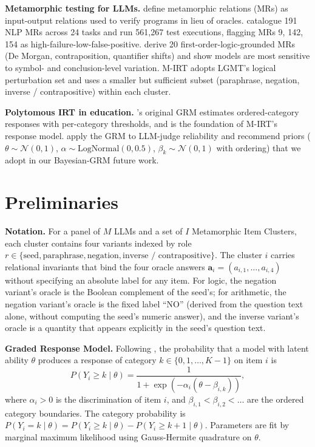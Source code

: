 \documentclass[11pt,letterpaper]{article}
\begin{document}
\textbf{Metamorphic testing for LLMs.} \citet{Chen2018} define metamorphic relations (MRs) as input-output relations used to verify programs in lieu of oracles. \citet{Cho2025} catalogue 191 NLP MRs across 24 tasks and run 561{,}267 test executions, flagging MRs 9, 142, 154 as high-failure-low-false-positive. \citet{Zhou2026} derive 20 first-order-logic-grounded MRs (De Morgan, contraposition, quantifier shifts) and show models are most sensitive to symbol- and conclusion-level variation. M-IRT adopts LGMT's logical perturbation set and uses a smaller but sufficient subset (paraphrase, negation, inverse / contrapositive) within each cluster.

\textbf{Polytomous IRT in education.} \citet{Samejima1968}'s original GRM estimates ordered-category responses with per-category thresholds, and is the foundation of M-IRT's response model. \citet{Choi2026} apply the GRM to LLM-judge reliability and recommend priors ($\theta \sim \mathcal{N}(0, 1)$, $\alpha \sim \mathrm{LogNormal}(0, 0.5)$, $\beta_k \sim \mathcal{N}(0, 1)$ with ordering) that we adopt in our Bayesian-GRM future work.

\section{Preliminaries}

\textbf{Notation.} For a panel of $M$ LLMs and a set of $I$ Metamorphic Item Clusters, each cluster contains four variants indexed by role $r \in \{\text{seed}, \text{paraphrase}, \text{negation}, \text{inverse / contrapositive}\}$. The cluster $i$ carries relational invariants that bind the four oracle answers $\mathbf{a}_i = (a_{i,1}, \ldots, a_{i,4})$ without specifying an absolute label for any item. For logic, the negation variant's oracle is the Boolean complement of the seed's; for arithmetic, the negation variant's oracle is the fixed label ``NO'' (derived from the question text alone, without computing the seed's numeric answer), and the inverse variant's oracle is a quantity that appears explicitly in the seed's question text.

\textbf{Graded Response Model.} Following \citet{Samejima1968}, the probability that a model with latent ability $\theta$ produces a response of category $k \in \{0, 1, \ldots, K-1\}$ on item $i$ is
\begin{equation}
P(Y_i \geq k \mid \theta) = \frac{1}{1 + \exp(-\alpha_i(\theta - \beta_{i,k}))},
\end{equation}
where $\alpha_i > 0$ is the discrimination of item $i$, and $\beta_{i,1} < \beta_{i,2} < \ldots$ are the ordered category boundaries. The category probability is $P(Y_i = k \mid \theta) = P(Y_i \geq k \mid \theta) - P(Y_i \geq k+1 \mid \theta)$. Parameters are fit by marginal maximum likelihood using Gauss-Hermite quadrature on $\theta$.
\end{document}
